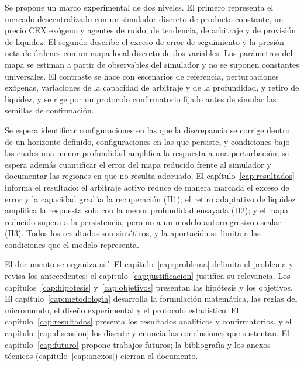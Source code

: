 Se propone un marco experimental de dos niveles. El primero representa el mercado descentralizado con un simulador discreto de producto constante, un precio CEX exógeno y agentes de ruido, de tendencia, de arbitraje y de provisión de liquidez. El segundo describe el exceso de error de seguimiento y la presión neta de órdenes con un mapa local discreto de dos variables. Los parámetros del mapa se estiman a partir de observables del simulador y no se suponen constantes universales. El contraste se hace con escenarios de referencia, perturbaciones exógenas, variaciones de la capacidad de arbitraje y de la profundidad, y retiro de liquidez, y se rige por un protocolo confirmatorio fijado antes de simular las semillas de confirmación.

Se espera identificar configuraciones en las que la discrepancia se corrige dentro de un horizonte definido, configuraciones en las que persiste, y condiciones bajo las cuales una menor profundidad amplifica la respuesta a una perturbación; se espera además cuantificar el error del mapa reducido frente al simulador y documentar las regiones en que no resulta adecuado. El capítulo~\ref{cap:resultados} informa el resultado: el arbitraje activo reduce de manera marcada el exceso de error y la capacidad gradúa la recuperación (H1); el retiro adaptativo de liquidez amplifica la respuesta solo con la menor profundidad ensayada (H2); y el mapa reducido supera a la persistencia, pero no a un modelo autorregresivo escalar (H3). Todos los resultados son sintéticos, y la aportación se limita a las condiciones que el modelo representa.

El documento se organiza así. El capítulo~\ref{cap:problema} delimita el problema y revisa los antecedentes; el capítulo~\ref{cap:justificacion} justifica su relevancia. Los capítulos~\ref{cap:hipotesis} y~\ref{cap:objetivos} presentan las hipótesis y los objetivos. El capítulo~\ref{cap:metodologia} desarrolla la formulación matemática, las reglas del micromundo, el diseño experimental y el protocolo estadístico. El capítulo~\ref{cap:resultados} presenta los resultados analíticos y confirmatorios, y el capítulo~\ref{cap:discusion} los discute y enuncia las conclusiones que sustentan. El capítulo~\ref{cap:futuro} propone trabajos futuros; la bibliografía y los anexos técnicos (capítulo~\ref{cap:anexos}) cierran el documento.
